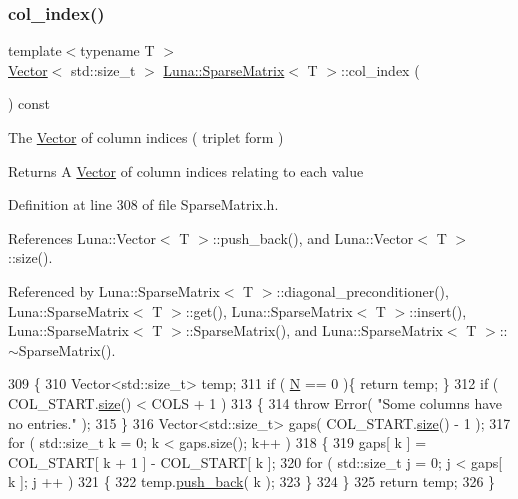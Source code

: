 \subsubsection{\texorpdfstring{col\+\_\+index()}{col\_index()}}
{\footnotesize\ttfamily template$<$typename T $>$ \\
\hyperlink{classLuna_1_1Vector}{Vector}$<$ std\+::size\+\_\+t $>$ \hyperlink{classLuna_1_1SparseMatrix}{Luna\+::\+Sparse\+Matrix}$<$ T $>$\+::col\+\_\+index (\begin{DoxyParamCaption}{ }\end{DoxyParamCaption}) const\hspace{0.3cm}{\ttfamily [inline]}}



The \hyperlink{classLuna_1_1Vector}{Vector} of column indices ( triplet form ) 

\begin{DoxyReturn}{Returns}
A \hyperlink{classLuna_1_1Vector}{Vector} of column indices relating to each value 
\end{DoxyReturn}


Definition at line 308 of file Sparse\+Matrix.\+h.



References Luna\+::\+Vector$<$ T $>$\+::push\+\_\+back(), and Luna\+::\+Vector$<$ T $>$\+::size().



Referenced by Luna\+::\+Sparse\+Matrix$<$ T $>$\+::diagonal\+\_\+preconditioner(), Luna\+::\+Sparse\+Matrix$<$ T $>$\+::get(), Luna\+::\+Sparse\+Matrix$<$ T $>$\+::insert(), Luna\+::\+Sparse\+Matrix$<$ T $>$\+::\+Sparse\+Matrix(), and Luna\+::\+Sparse\+Matrix$<$ T $>$\+::$\sim$\+Sparse\+Matrix().


\begin{DoxyCode}
309   \{
310     Vector<std::size\_t> temp;
311     \textcolor{keywordflow}{if} ( \hyperlink{namespaceHeat__plot_a7d050092798e28458a263710837bda77}{N} == 0 )\{ \textcolor{keywordflow}{return} temp; \}
312     \textcolor{keywordflow}{if} ( COL\_START.\hyperlink{classLuna_1_1Vector_ac9b6ed7a0df401728f27c193fbc8f4d8}{size}() < COLS + 1 )
313     \{
314       \textcolor{keywordflow}{throw} Error( \textcolor{stringliteral}{"Some columns have no entries."} );
315     \}
316     Vector<std::size\_t> gaps( COL\_START.\hyperlink{classLuna_1_1Vector_ac9b6ed7a0df401728f27c193fbc8f4d8}{size}() - 1 );
317     \textcolor{keywordflow}{for} ( std::size\_t k = 0; k < gaps.size(); k++ )
318     \{
319       gaps[ k ] = COL\_START[ k + 1 ] - COL\_START[ k ];
320       \textcolor{keywordflow}{for} ( std::size\_t j = 0; j < gaps[ k ]; j ++ )
321       \{
322         temp.\hyperlink{classLuna_1_1Vector_abf2693db9286f81cf68693fc4fb9fd18}{push\_back}( k );
323       \}
324     \}
325     \textcolor{keywordflow}{return} temp;
326   \}
\end{DoxyCode}
\mbox{\label{classLuna_1_1SparseMatrix_a5183843e7b13b0b359a9c98a91b30f6a}} 
